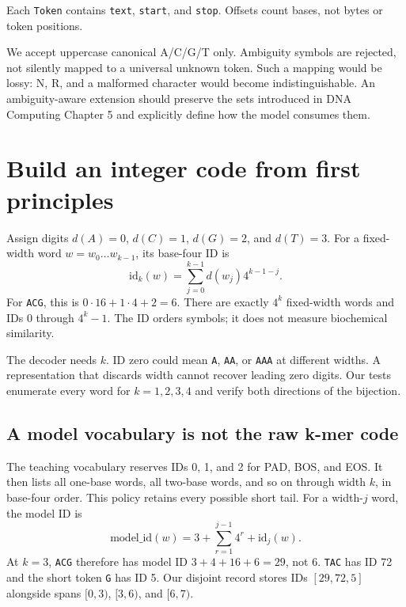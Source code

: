 Each \texttt{Token} contains \texttt{text}, \texttt{start}, and
\texttt{stop}. Offsets count bases, not bytes or token positions.

We accept uppercase canonical A/C/G/T only. Ambiguity symbols are rejected,
not silently mapped to a universal unknown token. Such a mapping would be
lossy: N, R, and a malformed character would become indistinguishable.
An ambiguity-aware extension should preserve the sets introduced in
DNA Computing Chapter 5 and explicitly define how the model consumes them.

\section{Build an integer code from first principles}

Assign digits $d(A)=0$, $d(C)=1$, $d(G)=2$, and $d(T)=3$. For a fixed-width
word $w=w_0\ldots w_{k-1}$, its base-four ID is
\begin{equation}
\mathrm{id}_k(w)=\sum_{j=0}^{k-1}d(w_j)4^{k-1-j}.
\label{eq:id}
\end{equation}
For \texttt{ACG}, this is $0\cdot16+1\cdot4+2=6$.
There are exactly $4^k$ fixed-width words and IDs $0$ through $4^k-1$.
The ID orders symbols; it does not measure biochemical similarity.



The decoder needs $k$. ID zero could mean \texttt{A}, \texttt{AA}, or
\texttt{AAA} at different widths. A representation that discards width
cannot recover leading zero digits. Our tests enumerate every word for
$k=1,2,3,4$ and verify both directions of the bijection.

\subsection{A model vocabulary is not the raw k-mer code}

The teaching vocabulary reserves IDs 0, 1, and 2 for PAD, BOS, and EOS.
It then lists all one-base words, all two-base words, and so on through
width $k$, in base-four order. This policy retains every possible short tail.
For a width-$j$ word, the model ID is
\begin{equation}
\mathrm{model\_id}(w)
=3+\sum_{r=1}^{j-1}4^r+\mathrm{id}_j(w).
\label{eq:model-id}
\end{equation}
At $k=3$, \texttt{ACG} therefore has model ID $3+4+16+6=29$,
not 6. \texttt{TAC} has ID 72 and the short token \texttt{G} has ID 5.
Our disjoint record stores IDs $[29,72,5]$ alongside spans
$[0,3)$, $[3,6)$, and $[6,7)$.

